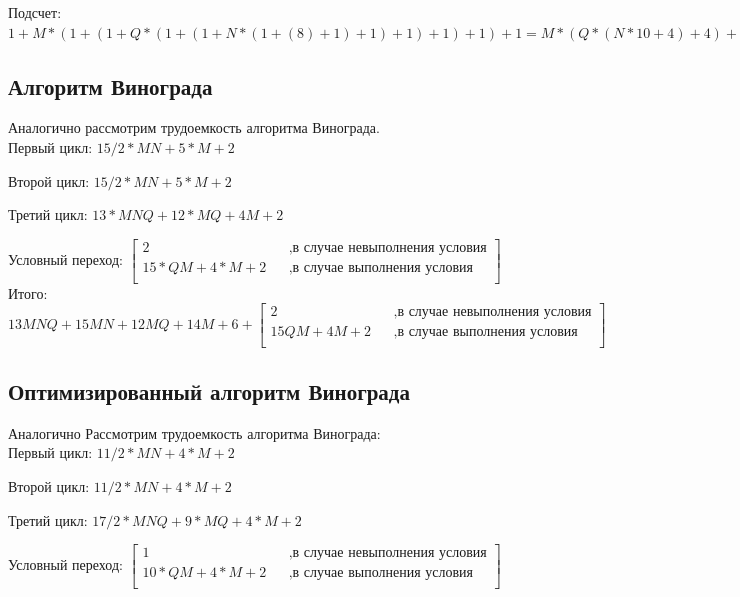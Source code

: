 \documentclass[12pt]{report}
\begin{document}
Подсчет:\\
$1 + M*(1 + (1 + Q*(1 + (1 + N*(1 + (8) + 1) + 1) + 1) + 1) + 1) + 1 = 
M*(Q*(N*10 + 4) + 4) + 4) + 2 = 10NQM + 4*QM + 4M +2
$

\subsection{Алгоритм Винограда}
Аналогично рассмотрим трудоемкость алгоритма Винограда.  \\

Первый цикл: $15/2 * MN + 5 * M + 2$ 

Второй цикл: $15/2 * MN + 5 * M + 2$

Третий цикл: $13*MNQ + 12*MQ + 4M + 2$

Условный переход: $\begin{bmatrix}
             2    &&, \text{в случае невыполнения условия}\\
             15*QM + 4*M + 2 &&, \text{в случае выполнения условия}\\
           \end{bmatrix} $ \\

Итого: $  13MNQ + 15MN + 12MQ + 14M + 6 + 
       \begin{bmatrix}
             2    &&, \text{в случае невыполнения условия}\\
             15QM + 4M + 2 &&, \text{в случае выполнения условия}\\
           \end{bmatrix} $ \\

\subsection{Оптимизированный алгоритм Винограда}

Аналогично Рассмотрим трудоемкость алгоритма Винограда:\\

Первый цикл: $11/2*MN + 4*M + 2$ 

Второй цикл: $11/2*MN + 4*M + 2$

Третий цикл: $17/2*MNQ + 9*MQ + 4*M + 2$

Условный переход: $\begin{bmatrix}
             1    &&, \text{в случае невыполнения условия}\\
             10*QM + 4*M + 2 &&, \text{в случае выполнения условия}\\
           \end{bmatrix} $ \\
\end{document}

